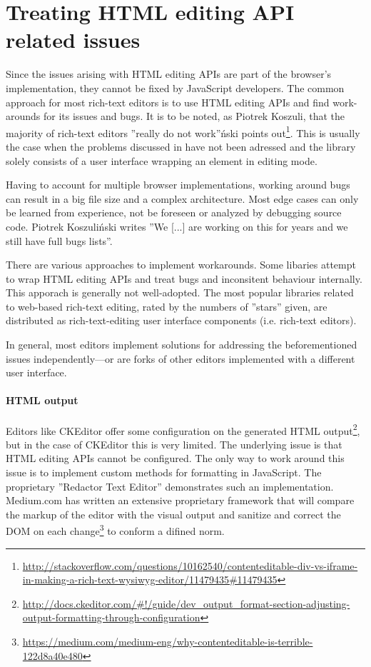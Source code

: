 
\section{Treating HTML editing API related issues}

Since the issues arising with HTML editing APIs are part of the browser's implementation, they cannot be fixed by JavaScript developers. The common approach for most rich-text editors is to use HTML editing APIs and find work-arounds for its issues and bugs. It is to be noted, as Piotrek Koszuli, that the majority of rich-text editors ''really do not work''\'{n}ski points out\footnote{\url{http://stackoverflow.com/questions/10162540/contenteditable-div-vs-iframe-in-making-a-rich-text-wysiwyg-editor/11479435\#11479435}}. This is usually the case when the problems discussed in  have not been adressed and the library solely consists of a user interface wrapping an element in editing mode.

Having to account for multiple browser implementations, working around bugs can result in a big file size and a complex architecture. Most edge cases can only be learned from experience, not be foreseen or analyzed by debugging source code. Piotrek Koszuli\'{n}ski writes ''We [...] are working on this for years and we still have full bugs lists''\cite{sopp}.

There are various approaches to implement workarounds. Some libaries attempt to wrap HTML editing APIs and treat bugs and inconsitent behaviour internally. This apporach is generally not well-adopted. The most popular libraries related to web-based rich-text editing, rated by the numbers of ''stars'' given, are distributed as rich-text-editing user interface components (i.e. rich-text editors).

In general, most editors implement solutions for addressing the beforementioned issues independently---or are forks of other editors implemented with a different user interface.

\paragraph{HTML output} Editors like CKEditor offer some configuration on the generated HTML output\footnote{\url{http://docs.ckeditor.com/\#!/guide/dev\_output\_format-section-adjusting-output-formatting-through-configuration}}, but in the case of CKEditor this is very limited. The underlying issue is that HTML editing APIs cannot be configured. The only way to work around this issue is to implement custom methods for formatting in JavaScript. The proprietary ''Redactor Text Editor'' demonstrates such an implementation. Medium.com has written an extensive proprietary framework that will compare the markup of the editor with the visual output and sanitize and correct the DOM on each change\footnote{\url{https://medium.com/medium-eng/why-contenteditable-is-terrible-122d8a40e480}} to conform a difined norm.

